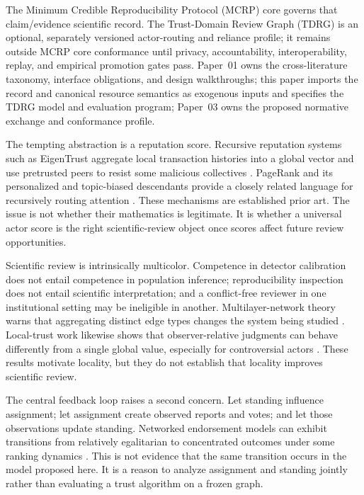 \documentclass[11pt]{article}
\begin{document}
The Minimum Credible Reproducibility Protocol (MCRP) core governs that claim/evidence scientific record. The Trust-Domain Review Graph (TDRG) is an optional, separately versioned actor-routing and reliance profile; it remains outside MCRP core conformance until privacy, accountability, interoperability, replay, and empirical promotion gates pass. Paper~01 owns the cross-literature taxonomy, interface obligations, and design walkthroughs; this paper imports the record and canonical resource semantics as exogenous inputs and specifies the TDRG model and evaluation program; Paper~03 owns the proposed normative exchange and conformance profile.

The tempting abstraction is a reputation score.  Recursive reputation systems such as EigenTrust aggregate local transaction histories into a global vector and use pretrusted peers to resist some malicious collectives \citep{kamvar2003eigentrust}.  PageRank and its personalized and topic-biased descendants provide a closely related language for recursively routing attention \citep{page1999pagerank,haveliwala2002topic}.  These mechanisms are established prior art.  The issue is not whether their mathematics is legitimate.  It is whether a universal actor score is the right scientific-review object once scores affect future review opportunities.

Scientific review is intrinsically multicolor.  Competence in detector calibration does not entail competence in population inference; reproducibility inspection does not entail scientific interpretation; and a conflict-free reviewer in one institutional setting may be ineligible in another.  Multilayer-network theory warns that aggregating distinct edge types changes the system being studied \citep{boccaletti2014multilayer}.  Local-trust work likewise shows that observer-relative judgments can behave differently from a single global value, especially for controversial actors \citep{massa2005local}.  These results motivate locality, but they do not establish that locality improves scientific review.

The central feedback loop raises a second concern.  Let standing influence assignment; let assignment create observed reports and votes; and let those observations update standing.  Networked endorsement models can exhibit transitions from relatively egalitarian to concentrated outcomes under some ranking dynamics \citep{kawakatsu2021hierarchy}.  This is not evidence that the same transition occurs in the model proposed here.  It is a reason to analyze assignment and standing jointly rather than evaluating a trust algorithm on a frozen graph.
\end{document}
